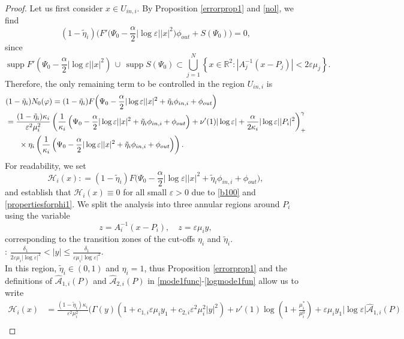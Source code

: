 \documentclass[11pt,reqno,a4paper]{amsart}
\numberwithin{equation}{section}
\newcommand{\R}{\mathbb{R}}
\newcommand{\defeq}{\mathrel{\mathop:}=}
\newcommand{\ve}{\varepsilon}
\begin{document}
\begin{proof}
Let us first consider $x\in U_{in,i}.$ By Proposition \ref{errorprop1} and \eqref{nol}, we find \[\left(1-\tilde{\eta}_i\right)\Big(F'\big(\Psi_0-\frac{\alpha}{2}|\log\ve||x|^2\big)\phi_{out}+S(\Psi_0)\Big)=0,\]
since 
\begin{equation}\label{errorandfsupport}
\operatorname{supp} F'\left(\Psi_0-\frac{\alpha}{2}|\log\ve||x|^2\right)\,\cup\, \operatorname{supp} S(\Psi_0) \subset \bigcup\limits_{j=1}^{N}\left\{x\in\R^2: |A_j^{-1}(x-P_j)| < 2\ve\mu_j\right\}.
\end{equation}
Therefore, the only remaining term to be controlled in the region $U_{in,i}$ is 
\begin{equation*}
\begin{aligned}
&(1-\tilde{\eta}_i)N_0(\varphi)=(1-\tilde{\eta}_i)F\Big(\Psi_0-\frac{\alpha}{2}|\log\ve||x|^2+\tilde{\eta}_i\phi_{in,i}+\phi_{out}\Big)\\
&=\frac{(1-\tilde{\eta}_i)\kappa_i}{\ve^2\mu_i^2}\left(\frac{1}{\kappa_i}\left(\Psi_0-\frac{\alpha}{2}|\log\ve||x|^2+\tilde{\eta}_i\phi_{in,i}+\phi_{out}\right)+\nu'(1)|\log\ve|+\frac{\alpha}{2\kappa_i}|\log\ve||P_i|^2\right)^{\gamma}_{+}\\
&\hspace{6mm}\times\eta_i\left(\frac{1}{\kappa_i}\left(\Psi_0-\frac{\alpha}{2}|\log\ve||x|^2+\tilde{\eta}_i\phi_{in,i}+\phi_{out}\right)\right).
\end{aligned}
\end{equation*} 
For readability, we set
\[\mathcal{H}_i(x)\defeq(1-\tilde{\eta}_i)F\Big(\Psi_0-\frac{\alpha}{2}|\log\ve||x|^2+\tilde{\eta}_i\phi_{in,i}+\phi_{out}\Big),\]
and establish that $\mathcal{H}_i(x)\equiv 0$  for all small $\ve>0$ due to \eqref{b100} and \eqref{propertiesforphi1}. We split the analysis into three annular regions around $P_i$ using the variable 
 \[z=A_{i}^{-1}(x-P_i), \quad z=\ve\mu_i y,\]
 corresponding to the transition zones of the cut-offs $\eta_i$ and $\tilde{\eta}_i$.
\\
:  $\frac{\delta_1}{2\ve\mu_i|\log\ve|^2}< |y| \leq \frac{\delta_1}{\ve\mu_i|\log\ve|^2}$.
\\
In this region, $\tilde{\eta}_i\in(0,1)$ and  $\eta_{i}=1$, thus Proposition \ref{errorprop1} and the definitions of $\widehat{\mathcal{A}}_{1,i}(P)$ and $\widehat{\mathcal{A}}_{2,i}(P)$ in \eqref{mode1func}-\eqref{logmode1fun} allow us to write 
\begin{equation*}
\begin{aligned}
\mathcal{H}_i(x)
&=\frac{\left(1-\tilde{\eta}_i\right)\kappa_i}{\ve^2\mu_i^2}\Bigg(\Gamma(y)(1+c_{1,i}\ve\mu_iy_1+c_{2,i}\ve^2\mu_i^2|y|^2)+\nu'(1)\log\left(1+\frac{\mu_i^{*}}{\mu_i^{0}}\right)+\ve\mu_iy_1|\log\ve|\widehat{\mathcal{A}}_{1,i}(P)\\

\end{aligned}
\end{equation*}
\end{proof}
\end{document}
